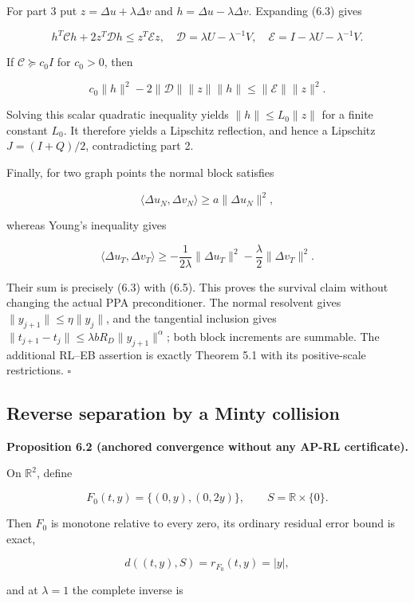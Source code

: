 \documentclass[11pt,a4paper]{article}
\theoremstyle{plain}
\theoremstyle{definition}
\theoremstyle{remark}
\begin{document}
For part 3 put \(z=\Delta u+\lambda\Delta v\) and
\(h=\Delta u-\lambda\Delta v\). Expanding (6.3) gives

\[
h^T\mathcal C h+2z^T\mathcal D h\le z^T\mathcal E z,
\quad
\mathcal D=\lambda U-\lambda^{-1}V,
\quad
\mathcal E=I-\lambda U-\lambda^{-1}V.
\]

If \(\mathcal C\succeq c_0I\) for \(c_0>0\), then

\[
c_0\|h\|^2-2\|\mathcal D\|\|z\|\|h\|
\le\|\mathcal E\|\|z\|^2.
\]

Solving this scalar quadratic inequality yields \(\|h\|\le L_0\|z\|\)
for a finite constant \(L_0\). It therefore yields a Lipschitz
reflection, and hence a Lipschitz \(J=(I+Q)/2\), contradicting part 2.

Finally, for two graph points the normal block satisfies

\[
\langle\Delta u_N,\Delta v_N\rangle\ge a\|\Delta u_N\|^2,
\]

whereas Young's inequality gives

\[
\langle\Delta u_T,\Delta v_T\rangle
\ge-\frac1{2\lambda}\|\Delta u_T\|^2
-\frac\lambda2\|\Delta v_T\|^2.
\]

Their sum is precisely (6.3) with (6.5). This proves the survival claim
without changing the actual PPA preconditioner. The normal resolvent
gives \(\|y_{j+1}\|\le \eta\|y_j\|\), and the tangential inclusion gives
\(\|t_{j+1}-t_j\|\le\lambda bR_D\|y_{j+1}\|^\alpha\); both block
increments are summable. The additional RL--EB assertion is exactly
Theorem 5.1 with its positive-scale restrictions. \(\square\)

\hypertarget{reverse-separation-by-a-minty-collision}{%
\subsection{Reverse separation by a Minty
collision}\label{reverse-separation-by-a-minty-collision}}

\textbf{Proposition 6.2 (anchored convergence without any AP-RL
certificate).}

On \(\mathbb R^2\), define

\[
F_0(t,y)=\{(0,y),(0,2y)\},\qquad S=\mathbb R\times\{0\}.
\]

Then \(F_0\) is monotone relative to every zero, its ordinary residual
error bound is exact,

\[
d((t,y),S)=r_{F_0}(t,y)=|y|,
\]

and at \(\lambda=1\) the complete inverse is
\end{document}
